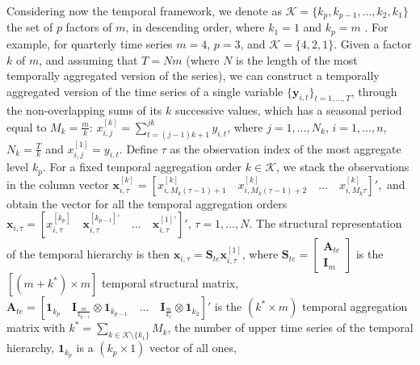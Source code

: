 \documentclass[a4paper,11pt]{article}
\newcommand{\Unovet}{\bm{1}}
\newcommand{\xvet}{\bm{x}}
\newcommand{\yvet}{\bm{y}}
\newcommand{\Avet}{\bm{A}}
\newcommand{\Ivet}{\bm{I}}
\newcommand{\Svet}{\bm{S}}
\theoremstyle{definition}
\begin{document}
Considering now the temporal framework, we denote as $\mathcal{K} = \{ k_p , k_{p-1}, \dots, k_2, k_1 \}$ the set of $p$ factors of $m$, in descending order, where $k_1= 1$ and $k_p= m$ \citep{athanasopoulos2017}. For example, for quarterly time series $m = 4$, $p = 3$, and $\mathcal{K} = \{4,2,1\}$.
Given a factor $k$ of $m$, and assuming that $T = N m$ (where $N$ is the length of the most temporally aggregated version of the series), we can construct a temporally aggregated version of the time series of a single variable $\{\yvet_{i,t}\}_{t = 1, \dots, T}$, through the non-overlapping sums of its $k$ successive values, which has a seasonal period equal to $M_k= \displaystyle\frac{m}{k}$: $x_{i,j}^{[k]} = \displaystyle\sum_{t=(j-1)k+1}^{jk} y_{i,t}$, where $j = 1,\dots, N_k$, $i = 1,\dots,n$, $N_k = \displaystyle\frac{T}{k}$ and $x_{i,j}^{[1]}=y_{i,t}$. Define $\tau$ as the observation index of the most aggregate level $k_p$. For a fixed temporal aggregation order $k \in \mathcal{K}$, we stack the observations in the column vector $\xvet_{i,\tau}^{[k]} = \left[x_{i,M_k(\tau-1)+1}^{[k]} \quad x_{i,M_k(\tau-1)+2}^{[k]} \quad \dots \quad x_{i,M_k\tau}^{[k]}\right]',$ and obtain the vector for all the temporal aggregation orders $\xvet_{i,\tau} = \left[x_{i,\tau}^{[k_p]} \quad \xvet_{i,\tau}^{[k_{p-1}]\prime} \quad \dots \quad \xvet_{i,\tau}^{[1]\prime} \right]'$, $\tau = 1,\dots,N$. The structural representation of the temporal hierarchy \citep{athanasopoulos2017} is then $\xvet_{i,\tau} = \Svet_{te}\xvet_{i,\tau}^{[1]}$, where $\Svet_{te} = \left[\begin{array}{c}
	\Avet_{te} \\
	\Ivet_{m}
\end{array}\right]$ is the $[(m+k^\ast) \times m]$ temporal structural matrix, $\Avet_{te} = \left[\Unovet_{k_p} \quad \Ivet_{\frac{m}{k_{p-1}}} \otimes \Unovet_{k_{p-1}} \quad \dots \quad \Ivet_{\frac{m}{k_{2}}}  \otimes \Unovet_{k_2} \right]'$
is the $(k^\ast \times m)$ temporal aggregation matrix with $k^\ast = \displaystyle\sum_{k \in \mathcal{K}\setminus\{k_1\}} M_k$, the number of upper time series of the temporal hierarchy, $\Unovet_{k_p}$ is a $(k_p \times 1)$ vector of all ones,
\end{document}
